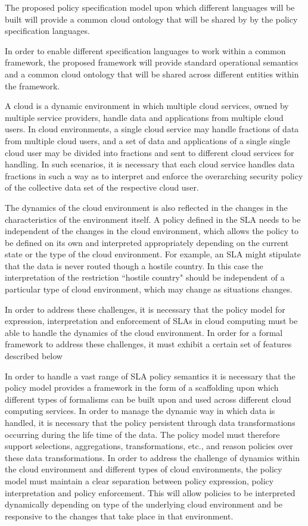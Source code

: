 \documentclass[times, 10pt,twocolumn]{article}
\begin{document}
The proposed policy specification model upon which different languages will be built will provide a common cloud ontology that will be shared by by the policy specification languages.

In order to enable different specification languages to work within a common framework, the proposed framework will provide standard operational semantics and a common cloud ontology that will be shared across different entities within the framework. 

A cloud is a dynamic environment in which multiple cloud services, owned by multiple service providers, handle data and applications from multiple cloud users. In cloud environments, a single cloud service may handle fractions of data from multiple cloud users, and a set of data and applications of a single single cloud user may be divided into fractions and sent to different cloud services for handling. In such scenarios, it is necessary that each cloud service handles data fractions in such a way as to interpret and enforce the overarching security policy of the collective data set of the respective cloud user. 

The dynamics of the cloud environment is also reflected in the changes in the characteristics of the environment itself. A policy defined in the SLA needs to be independent of the changes in the cloud environment, which allows the policy to be defined on its own and interpreted appropriately depending on the current state or the type of the cloud environment. For example, an SLA might stipulate that the data is never routed though a hostile country. In this case the interpretation of the restriction ``hostile country" should be independent of a particular type of cloud environment, which may change as situations changes. 

In order to address these challenges, it is necessary that the policy model for expression, interpretation and enforcement of SLAs in cloud computing must be able to handle the dynamics of the cloud environment. In order for a formal framework to address these challenges, it must exhibit a certain set of features described below 

In order to handle a vast range of SLA policy semantics it is necessary that the policy model provides a framework in the form of a scaffolding upon which different types of formalisms can be built upon and used across different cloud computing services. In order to manage the dynamic way in which data is handled, it is necessary that the policy persistent through data transformations occurring during the life time of the data. The policy model must therefore support selections, aggregations, transformations, etc., and reason policies over these data transformations. In order to address the challenge of dynamics within the cloud environment and different types of cloud environments, the policy model must maintain a clear separation between policy expression, policy interpretation and policy enforcement. This will allow policies to be interpreted dynamically depending on type of the underlying cloud environment and be responsive to the changes that take place in that environment.  
\end{document}
